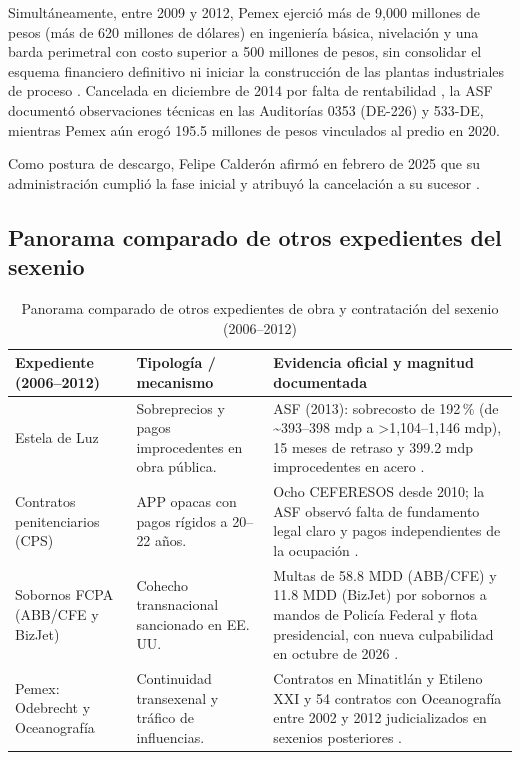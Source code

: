 \documentclass[12pt,letterpaper,oneside]{article}
\begin{document}
Simultáneamente, entre 2009 y 2012, Pemex ejerció más de 9,000 millones de pesos (más de 620 millones de dólares) en ingeniería básica, nivelación y una barda perimetral con costo superior a 500 millones de pesos, sin consolidar el esquema financiero definitivo ni iniciar la construcción de las plantas industriales de proceso \citep{asf2015,asf2016,raziel2021}. Cancelada en diciembre de 2014 por falta de rentabilidad \citep{montoya2014}, la ASF documentó observaciones técnicas en las Auditorías 0353 (DE-226) y 533-DE, mientras Pemex aún erogó 195.5 millones de pesos vinculados al predio en 2020.

Como postura de descargo, Felipe Calderón afirmó en febrero de 2025 que su administración cumplió la fase inicial y atribuyó la cancelación a su sucesor \citep{elfinanciero2025}.

\subsection{Panorama comparado de otros expedientes del sexenio}

\begin{table}[H]
\centering
\caption{Panorama comparado de otros expedientes de obra y contratación del sexenio (2006--2012)}
\label{tab:expedientes}
\small
\begin{tabular}{@{}p{2.5cm}p{4cm}p{6.5cm}@{}}
\toprule
\textbf{Expediente (2006--2012)} & \textbf{Tipología / mecanismo} & \textbf{Evidencia oficial y magnitud documentada} \\
\midrule
Estela de Luz & Sobreprecios y pagos improcedentes en obra pública. & ASF (2013): sobrecosto de 192\,\% (de \textasciitilde393--398 mdp a >1,104--1,146 mdp), 15 meses de retraso y 399.2 mdp improcedentes en acero \citep{asf2013,obrasexpansion2013}. \\
\addlinespace
Contratos penitenciarios (CPS) & APP opacas con pagos rígidos a 20--22 años. & Ocho CEFERESOS desde 2010; la ASF observó falta de fundamento legal claro y pagos independientes de la ocupación \citep{documenta2022,badillo2021}. \\
\addlinespace
Sobornos FCPA (ABB/CFE y BizJet) & Cohecho transnacional sancionado en EE.\,UU. & Multas de 58.8 MDD (ABB/CFE) y 11.8 MDD (BizJet) por sobornos a mandos de Policía Federal y flota presidencial, con nueva culpabilidad en octubre de 2026 \citep{doj2013bizjet,doj2026bizjet,rodriguez2011}. \\
\addlinespace
Pemex: Odebrecht y Oceanografía & Continuidad transexenal y tráfico de influencias. & Contratos en Minatitlán y Etileno XXI y 54 contratos con Oceanografía entre 2002 y 2012 judicializados en sexenios posteriores \citep{fundar2022,guerrero2018}. \\
\bottomrule
\end{tabular}
\end{table}
\end{document}
